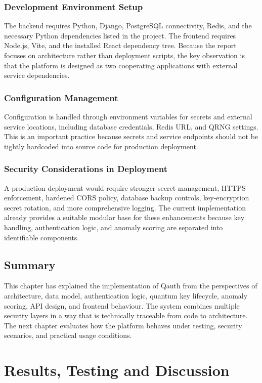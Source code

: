 \documentclass[12pt,a4paper]{report}
\begin{document}
\subsection{Development Environment Setup}
The backend requires Python, Django, PostgreSQL connectivity, Redis, and the necessary Python dependencies listed in the project. The frontend requires Node.js, Vite, and the installed React dependency tree. Because the report focuses on architecture rather than deployment scripts, the key observation is that the platform is designed as two cooperating applications with external service dependencies.

\subsection{Configuration Management}
Configuration is handled through environment variables for secrets and external service locations, including database credentials, Redis URL, and QRNG settings. This is an important practice because secrets and service endpoints should not be tightly hardcoded into source code for production deployment.

\subsection{Security Considerations in Deployment}
A production deployment would require stronger secret management, HTTPS enforcement, hardened CORS policy, database backup controls, key-encryption secret rotation, and more comprehensive logging. The current implementation already provides a suitable modular base for these enhancements because key handling, authentication logic, and anomaly scoring are separated into identifiable components.

\section{Summary}
This chapter has explained the implementation of Qauth from the perspectives of architecture, data model, authentication logic, quantum key lifecycle, anomaly scoring, API design, and frontend behaviour. The system combines multiple security layers in a way that is technically traceable from code to architecture. The next chapter evaluates how the platform behaves under testing, security scenarios, and practical usage conditions.


\chapter{Results, Testing and Discussion}
\end{document}
